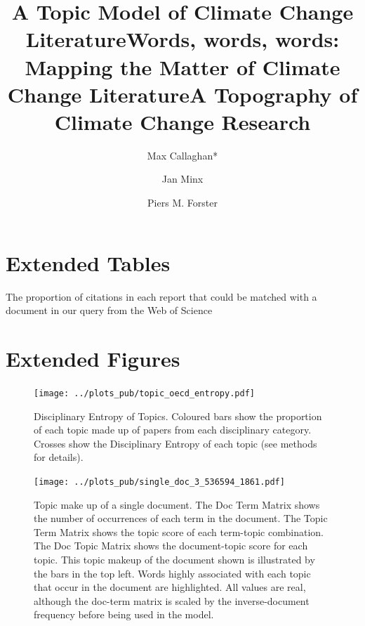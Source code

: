 \documentclass{article}
\makeatletter
\renewcommand{\maketitle}{\bgroup\setlength{\parindent}{0pt}
	\begin{flushleft}
		
		{\huge\textbf{\@title}}
		
		\bigskip
		
		{\large\textbf{\@author}}
		
		\bigskip
		
		{\large{ \@date}}
		
	\end{flushleft}\egroup
}
\makeatother
\begin{document}
	\title{A Topic Model of Climate Change Literature}
	\title{Words, words, words: Mapping the Matter of Climate Change Literature}
	\title{A Topography of Climate Change Research}
	
\author[1,2]{Max Callaghan*}
\author[1,2]{Jan Minx}
\author[2]{Piers M. Forster}

	\maketitle
	
		\section*{Extended Tables}
	
	\begin{table}[htp]
		\begin{center}
			
			\caption{The proportion of citations in each report that could be matched with a document in our query from the Web of Science}
			\label{ipcc-matching}
		\end{center}
	\end{table}


	\section*{Extended Figures}
			\setcounter{figure}{0}


\begin{figure}
	\begin{center}
		\texttt{[image: ../plots\_pub/topic\_oecd\_entropy.pdf]}
		\caption{Disciplinary Entropy of Topics. Coloured bars show the proportion of each topic made up of papers from each disciplinary category. Crosses show the Disciplinary Entropy of each topic (see methods for details).}
		\label{dis-entropy}
	\end{center}
\end{figure}	



\begin{figure}
	\begin{center}
		\texttt{[image: ../plots\_pub/single\_doc\_3\_536594\_1861.pdf]}
		\caption{Topic make up of a single document. The Doc Term Matrix shows the number of occurrences of each term in the document. The Topic Term Matrix shows the topic score of each term-topic combination. The Doc Topic Matrix shows the document-topic score for each topic. This topic makeup of the document shown is illustrated by the bars in the top left. Words highly associated with each topic that occur in the document are highlighted. All values are real, although the doc-term matrix is scaled by the inverse-document frequency before being used in the model.}
		\label{doc-topic}
	\end{center}
\end{figure}
\end{document}

